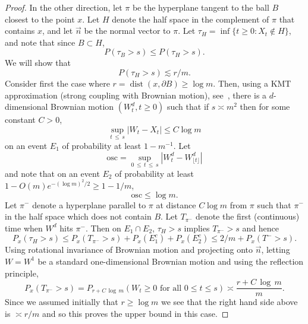 \documentclass[AHL, Unicode, longabstracts, published]{cedram}
\DeclareMathOperator{\dist}{dist}
\newcommand{\Pmh}{P}
\begin{document}
\begin{proof}
In the other direction, let $\pi$ be the hyperplane tangent to the ball $B$ closest to the point $x$. Let $H$ denote the half space in the complement of $\pi$ that contains $x$, and let $\vec{n}$ be the normal vector to $\pi$. Let $\tau_{H} = \inf\{t \ge 0: X_t \notin H\}$, and note that since $B \subset H$,
\[
\Pmh(\tau_B>s) \le \Pmh(\tau_H >s).
\]
We will show that
\begin{equation}\label{Tplane}
\Pmh(\tau_H > s) \lesssim r/ m.
\end{equation}
Consider first the case where $r = \dist (x, \partial B) \ge \log m$. Then, using a KMT approximation (strong coupling with Brownian motion), see~\cite[Theorem~7.1.1]{LL}, there is a $d$-dimensional Brownian motion $(W^d_t, t \ge 0)$ such that if $s \asymp m^2$ then for some constant $C>0$,
\[
\sup_{t\,\le\,s} |W_t - X_t | \le C \log m
\]
on an event $E_1$ of probability at least $ 1- m^{-1}$.
Let
\[
\text{osc} = \sup_{0\,\le\,t\,\le\,s} \left|W^d_t - W^d_{\lfloor t \rfloor}\right|
\]
and note that on an event $E_2$ of probability at least $ 1- O(m) e^{ - (\log m)^2/2} \ge 1- 1/m$,
\[
\text{osc} \le \log m.
\]
Let $\pi^-$ denote a hyperplane parallel to $\pi$ at distance $C\log m$ from $\pi$ such that $\pi^-$ in the half space which does not contain $B$. Let $T_{\pi^-}$ denote the first (continuous) time when $W^d$ hits $\pi^-$. Then on $E_1 \cap E_2$, $\tau_H > s$ implies $T_{\pi^-} > s$ and hence
\[
\Pmh_x(\tau_H>s) \le \Pmh_x(T_{\pi^-} >s) + \Pmh_x(E_1^c) + \Pmh_x(E_2^c) \le 2/m + \Pmh_x(T^- >s).
\]
Using rotational invariance of Brownian motion and projecting onto $\vec{n}$, letting $W= W^1$ be a standard one-dimensional Brownian motion and using the reflection principle,
\[
\Pmh_x(T_{\pi^-} >s) = \Pmh_{r + C\,\log\,m} (W_t \ge 0 \text{ for all } 0\le t \le s)\asymp \frac{r+ C\,\log \,m}{m}.
\]
Since we assumed initially that $ r \ge \log m$ we see that the right hand side above is $\asymp r/m$ and so this proves the upper bound in this case.


\end{proof}
\end{document}
